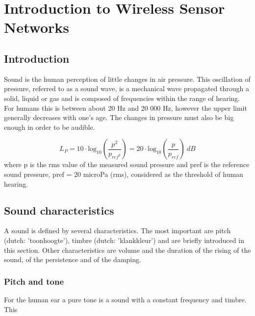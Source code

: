 
\chapter{Introduction to Wireless Sensor Networks} %
\label{Chapter1} %

\section{Introduction}
Sound is the human perception of little changes in air pressure. This oscillation of pressure, referred to as a sound wave, is a mechanical wave propagated through a solid, liquid or gas and is composed of frequencies within the range of hearing. For humans this is between about 20 Hz and 20 000 Hz, however the upper limit generally decreases with one's age.   The changes in pressure must also be big enough in order to be audible.

\begin{equation}
L_{P} = 10\cdot \mathrm{log}_{10} (\frac{p^{2}}{p_{ref^{2}}} ) = 20 \cdot \mathrm{log}_{10} (\frac{p}{p_{ref}}) \medspace dB
\end{equation}
where p is the rms value of the measured sound pressure and pref is the reference sound pressure, pref = 20 microPa (rms), considered as the threshold of human hearing.

\section{Sound characteristics}
A sound is defined by several characteristics. The most important are pitch (dutch: 'toonhoogte'), timbre (dutch: 'klankkleur') and are briefly introduced in this section. Other characteristics are volume and the duration of the rising of the sound, of the persistence and of the damping.

\subsection{Pitch and tone}
For the human ear a pure tone is a sound with a constant frequency and timbre. This 

